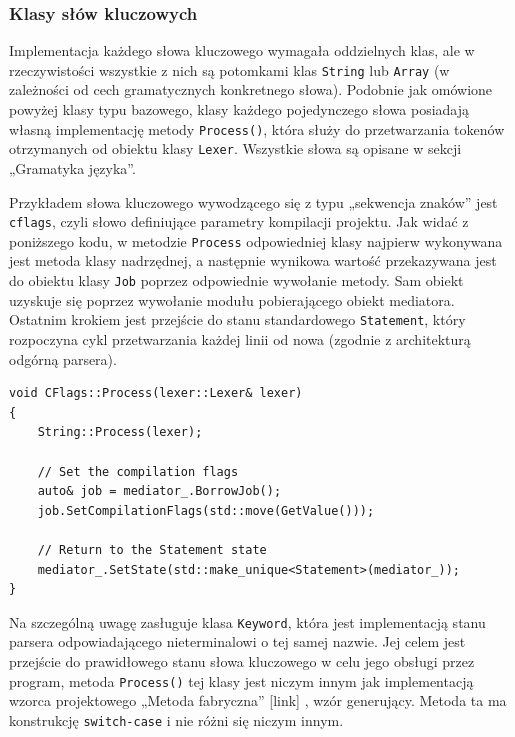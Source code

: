 \subsubsection{Klasy słów kluczowych}

Implementacja każdego słowa kluczowego wymagała oddzielnych klas, ale w rzeczywistości wszystkie z nich są potomkami klas \texttt{String} lub \texttt{Array} (w zależności od cech gramatycznych konkretnego słowa). Podobnie jak omówione powyżej klasy typu bazowego, klasy każdego pojedynczego słowa posiadają własną implementację metody \texttt{Process()}, która służy do przetwarzania tokenów otrzymanych od obiektu klasy \texttt{Lexer}. Wszystkie słowa są opisane w sekcji „Gramatyka języka”.

Przykładem słowa kluczowego wywodzącego się z typu „sekwencja znaków” jest \texttt{cflags}, czyli słowo definiujące parametry kompilacji projektu. Jak widać z poniższego kodu, w metodzie \texttt{Process} odpowiedniej klasy najpierw wykonywana jest metoda klasy nadrzędnej, a następnie wynikowa wartość przekazywana jest do obiektu klasy \texttt{Job} poprzez odpowiednie wywołanie metody. Sam obiekt uzyskuje się poprzez wywołanie modułu pobierającego obiekt mediatora. Ostatnim krokiem jest przejście do stanu standardowego \texttt{Statement}, który rozpoczyna cykl przetwarzania każdej linii od nowa (zgodnie z architekturą odgórną parsera).

\begin{lstlisting}[label=list:cflags,caption=Metoda CFlags::Process(),basicstyle=\footnotesize\ttfamily]
void CFlags::Process(lexer::Lexer& lexer)
{
    String::Process(lexer);

    // Set the compilation flags
    auto& job = mediator_.BorrowJob();
    job.SetCompilationFlags(std::move(GetValue()));

    // Return to the Statement state
    mediator_.SetState(std::make_unique<Statement>(mediator_));
}
\end{lstlisting}
    
Na szczególną uwagę zasługuje klasa \texttt{Keyword}, która jest implementacją stanu parsera odpowiadającego nieterminalowi o tej samej nazwie. Jej celem jest przejście do prawidłowego stanu słowa kluczowego w celu jego obsługi przez program, metoda \texttt{Process()} tej klasy jest niczym innym jak implementacją wzorca projektowego „Metoda fabryczna” [link] , wzór generujący. Metoda ta ma konstrukcję \texttt{switch-case} i nie różni się niczym innym.

